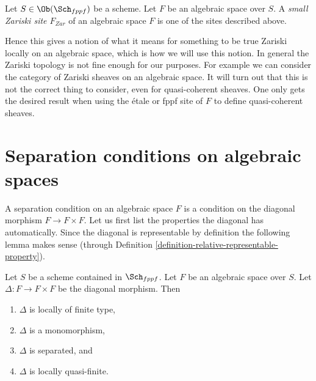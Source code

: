 \begin{definition}
\label{definition-small-Zariski-site}
Let $S \in \Ob(\Sch_{fppf})$ be a scheme. Let $F$ be an algebraic space over
$S$. A {\it small Zariski site $F_{Zar}$} of an algebraic space $F$ is one
of the sites described above.
\end{definition}

\noindent
Hence this gives a notion of what it means for something to be true
Zariski locally on an algebraic space, which is how we will use this
notion. In general the Zariski topology is not fine enough for our
purposes. For example we can consider the category of Zariski sheaves
on an algebraic space. It will turn out that this is not the
correct thing to consider, even for quasi-coherent sheaves.
One only gets the desired result when using the \'etale or fppf site of
$F$ to define quasi-coherent sheaves.











\section{Separation conditions on algebraic spaces}
\label{section-separation}

\noindent
A separation condition on an algebraic space $F$ is a condition
on the diagonal morphism $F \to F \times F$. Let us first
list the properties the diagonal has automatically.
Since the diagonal is representable by definition the following lemma
makes sense (through
Definition \ref{definition-relative-representable-property}).

\begin{lemma}
\label{lemma-properties-diagonal}
Let $S$ be a scheme contained in $\Sch_{fppf}$.
Let $F$ be an algebraic space over $S$.
Let $\Delta : F \to F \times F$ be the diagonal morphism.
Then
\begin{enumerate}
\item $\Delta$ is locally of finite type,
\item $\Delta$ is a monomorphism,
\item $\Delta$ is separated, and
\item $\Delta$ is locally quasi-finite.
\end{enumerate}
\end{lemma}

